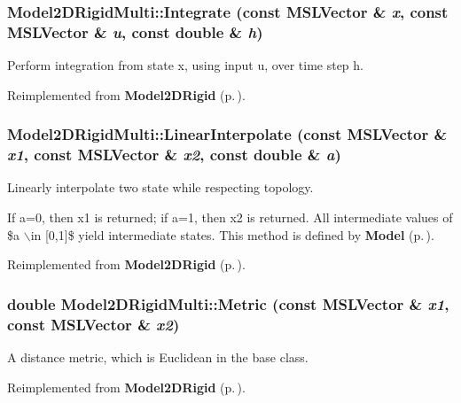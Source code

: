 \subsubsection{ Model2DRigid\-Multi::Integrate (const {\bf MSLVector} \& {\em x}, const {\bf MSLVector} \& {\em u}, const double \& {\em h})\hspace{0.3cm}{\tt  [virtual]}}\label{classModel2DRigidMulti_a6}


Perform integration from state x, using input u, over time step h.



Reimplemented from {\bf Model2DRigid} {\rm (p.\,\pageref{classModel2DRigid_a2})}.
\subsubsection{ Model2DRigid\-Multi::Linear\-Interpolate (const {\bf MSLVector} \& {\em x1}, const {\bf MSLVector} \& {\em x2}, const double \& {\em a})\hspace{0.3cm}{\tt  [virtual]}}\label{classModel2DRigidMulti_a4}


Linearly interpolate two state while respecting topology.

If a=0, then x1 is returned; if a=1, then x2 is returned. All intermediate values of \$a $\backslash$in [0,1]\$ yield intermediate states. This method is defined by {\bf Model} {\rm (p.\,\pageref{classModel})}. 

Reimplemented from {\bf Model2DRigid} {\rm (p.\,\pageref{classModel2DRigid_a4})}.
\subsubsection{\setlength{\rightskip}{0pt plus 5cm}double Model2DRigid\-Multi::Metric (const {\bf MSLVector} \& {\em x1}, const {\bf MSLVector} \& {\em x2})\hspace{0.3cm}{\tt  [virtual]}}\label{classModel2DRigidMulti_a2}


A distance metric, which is Euclidean in the base class.



Reimplemented from {\bf Model2DRigid} {\rm (p.\,\pageref{classModel2DRigid_a6})}.
